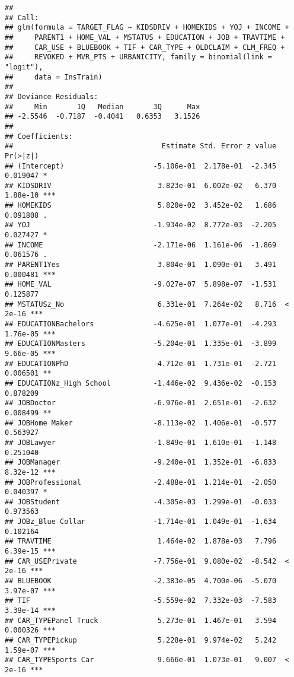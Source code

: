 \documentclass[]{article}
\begin{document}
\begin{verbatim}
## 
## Call:
## glm(formula = TARGET_FLAG ~ KIDSDRIV + HOMEKIDS + YOJ + INCOME + 
##     PARENT1 + HOME_VAL + MSTATUS + EDUCATION + JOB + TRAVTIME + 
##     CAR_USE + BLUEBOOK + TIF + CAR_TYPE + OLDCLAIM + CLM_FREQ + 
##     REVOKED + MVR_PTS + URBANICITY, family = binomial(link = "logit"), 
##     data = InsTrain)
## 
## Deviance Residuals: 
##     Min       1Q   Median       3Q      Max  
## -2.5546  -0.7187  -0.4041   0.6353   3.1526  
## 
## Coefficients:
##                                   Estimate Std. Error z value Pr(>|z|)    
## (Intercept)                     -5.106e-01  2.178e-01  -2.345 0.019047 *  
## KIDSDRIV                         3.823e-01  6.002e-02   6.370 1.88e-10 ***
## HOMEKIDS                         5.820e-02  3.452e-02   1.686 0.091808 .  
## YOJ                             -1.934e-02  8.772e-03  -2.205 0.027427 *  
## INCOME                          -2.171e-06  1.161e-06  -1.869 0.061576 .  
## PARENT1Yes                       3.804e-01  1.090e-01   3.491 0.000481 ***
## HOME_VAL                        -9.027e-07  5.898e-07  -1.531 0.125877    
## MSTATUSz_No                      6.331e-01  7.264e-02   8.716  < 2e-16 ***
## EDUCATIONBachelors              -4.625e-01  1.077e-01  -4.293 1.76e-05 ***
## EDUCATIONMasters                -5.204e-01  1.335e-01  -3.899 9.66e-05 ***
## EDUCATIONPhD                    -4.712e-01  1.731e-01  -2.721 0.006501 ** 
## EDUCATIONz_High School          -1.446e-02  9.436e-02  -0.153 0.878209    
## JOBDoctor                       -6.976e-01  2.651e-01  -2.632 0.008499 ** 
## JOBHome Maker                   -8.113e-02  1.406e-01  -0.577 0.563927    
## JOBLawyer                       -1.849e-01  1.610e-01  -1.148 0.251040    
## JOBManager                      -9.240e-01  1.352e-01  -6.833 8.32e-12 ***
## JOBProfessional                 -2.488e-01  1.214e-01  -2.050 0.040397 *  
## JOBStudent                      -4.305e-03  1.299e-01  -0.033 0.973563    
## JOBz_Blue Collar                -1.714e-01  1.049e-01  -1.634 0.102164    
## TRAVTIME                         1.464e-02  1.878e-03   7.796 6.39e-15 ***
## CAR_USEPrivate                  -7.756e-01  9.080e-02  -8.542  < 2e-16 ***
## BLUEBOOK                        -2.383e-05  4.700e-06  -5.070 3.97e-07 ***
## TIF                             -5.559e-02  7.332e-03  -7.583 3.39e-14 ***
## CAR_TYPEPanel Truck              5.273e-01  1.467e-01   3.594 0.000326 ***
## CAR_TYPEPickup                   5.228e-01  9.974e-02   5.242 1.59e-07 ***
## CAR_TYPESports Car               9.666e-01  1.073e-01   9.007  < 2e-16 ***

\end{verbatim}
\end{document}
